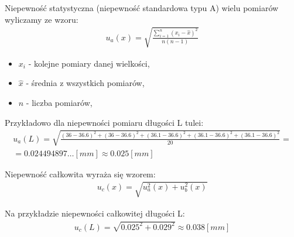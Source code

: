 \documentclass[11pt]{article}
\begin{document}
    \noindent Niepewność statystyczna (niepewność standardowa typu A) wielu pomiarów wyliczamy ze wzoru:
    \begin{gather*}
        u_a(x)=\sqrt{\frac{\sum_{i=1}^n (x_i-\hat{x})^2}{n(n-1)}}
    \end{gather*}
    {\footnotesize
        \begin{itemize}
            \item[] $x_i$ - kolejne pomiary danej wielkości,
            \item[] $\hat{x}$ - średnia z wszystkich pomiarów,
            \item[] $n$ - liczba pomiarów,
        \end{itemize}}
    \noindent Przykładowo dla niepewności pomiaru długości L tulei:
    \begin{gather*}
        u_a(L)=\sqrt{\frac{ (36-36.6)^2+(36-36.6)^2+(36.1-36.6)^2+(36.1-36.6)^2+(36.1-36.6)^2}{20}}=\\
        =0.024494897\dots[mm] \approx 0.025 [mm]
    \end{gather*}

    \noindent Niepewność całkowita wyraża się wzorem:
    \begin{gather*}
        u_c(x)=\sqrt{u_a^2(x)+u_b^2(x)}
    \end{gather*}

    \noindent Na przykładzie niepewności całkowitej długości L:
    \begin{gather*}
        u_c(L)=\sqrt{0.025^2+0.029^2}\approx 0.038 [mm]
    \end{gather*}
\end{document}
